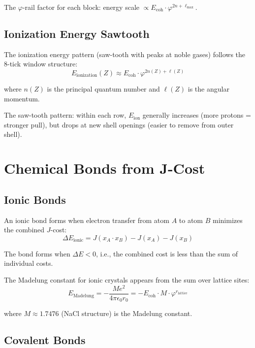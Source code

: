 \documentclass[12pt,a4paper]{article}
\theoremstyle{definition}
\theoremstyle{remark}
\begin{document}
The $\varphi$-rail factor for each block: energy scale $\propto E_\mathrm{coh} \cdot \varphi^{2n + \ell_\mathrm{max}}$.

\subsection{Ionization Energy Sawtooth}

The ionization energy pattern (saw-tooth with peaks at noble gases) follows the 
8-tick window structure:
\begin{equation}
E_\mathrm{ionization}(Z) \approx E_\mathrm{coh} \cdot \varphi^{2n(Z) + \ell(Z)}
\end{equation}

where $n(Z)$ is the principal quantum number and $\ell(Z)$ is the angular momentum.

The saw-tooth pattern: within each row, $E_\mathrm{ion}$ generally increases (more 
protons = stronger pull), but drops at new shell openings (easier to remove from outer shell).

\section{Chemical Bonds from J-Cost}

\subsection{Ionic Bonds}

An ionic bond forms when electron transfer from atom $A$ to atom $B$ minimizes 
the combined $J$-cost:
\begin{equation}
\Delta E_\mathrm{ionic} = J(x_A \cdot x_B) - J(x_A) - J(x_B)
\end{equation}

The bond forms when $\Delta E < 0$, i.e., the combined cost is less than the sum 
of individual costs.

The Madelung constant for ionic crystals appears from the sum over lattice sites:
\begin{equation}
E_\mathrm{Madelung} = -\frac{M e^2}{4\pi\epsilon_0 r_0} = -E_\mathrm{coh} \cdot M \cdot \varphi^{r_\mathrm{lattice}}
\end{equation}

where $M \approx 1.7476$ (NaCl structure) is the Madelung constant.

\subsection{Covalent Bonds}
\end{document}
